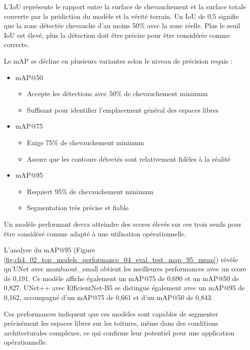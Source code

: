 L'IoU représente le rapport entre la surface de chevauchement et la surface totale couverte par la prédiction du modèle et la vérité terrain. Un IoU de 0,5 signifie que la zone détectée chevauche d'au moins 50\% avec la zone réelle. Plus le seuil IoU est élevé, plus la détection doit être précise pour être considérée comme correcte.

Le mAP se décline en plusieurs variantes selon le niveau de précision requis :

\begin{itemize}
    \item mAP@50
    \begin{itemize}
        \item Accepte les détections avec 50\% de chevauchement minimum
        \item Suffisant pour identifier l'emplacement général des espaces libres
    \end{itemize}
    \item mAP@75
    \begin{itemize}
        \item Exige 75\% de chevauchement minimum
        \item Assure que les contours détectés sont relativement fidèles à la réalité
    \end{itemize}
    \item mAP@95
    \begin{itemize}
        \item Requiert 95\% de chevauchement minimum
        \item Segmentation très précise et fiable
    \end{itemize}
\end{itemize}

Un modèle performant devra atteindre des scores élevés sur ces trois seuils pour être considéré comme adapté à une utilisation opérationnelle.

L'analyse du mAP@95 (Figure \ref{fig:ch4_02_top_models_performance_04_eval_test_map_95_mean}) révèle qu'UNet avec mambaout\_small obtient les meilleures performances avec un score de 0,191. Ce modèle affiche également un mAP@75 de 0,690 et un mAP@50 de 0,827. UNet++ avec EfficientNet-B5 se distingue également avec un mAP@95 de 0,162, accompagné d'un mAP@75 de 0,661 et d'un mAP@50 de 0,843.

Ces performances indiquent que ces modèles sont capables de segmenter précisément les espaces libres sur les toitures, même dans des conditions architecturales complexes, ce qui confirme leur potentiel pour une application opérationnelle.

